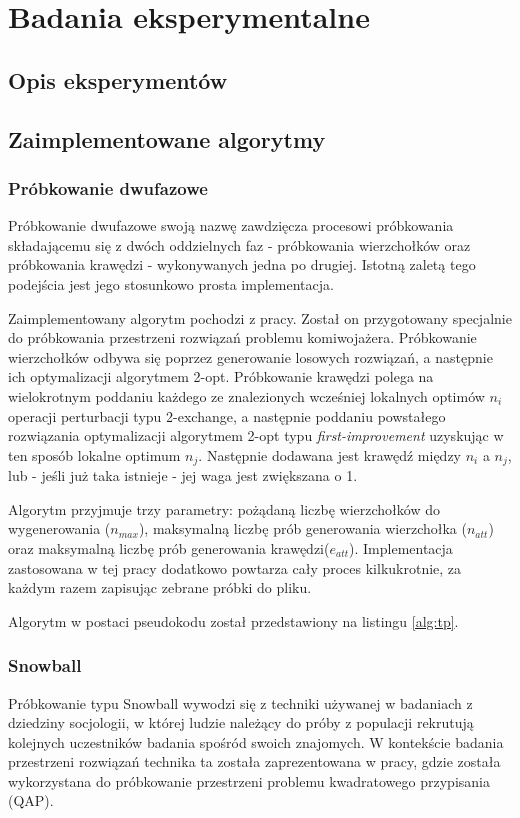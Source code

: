 \chapter{Badania eksperymentalne}

\section{Opis eksperymentów}
\section{Zaimplementowane algorytmy}
\subsection{Próbkowanie dwufazowe}
Próbkowanie dwufazowe swoją nazwę zawdzięcza procesowi próbkowania składającemu się z dwóch oddzielnych faz
- próbkowania wierzchołków oraz próbkowania krawędzi - wykonywanych jedna po drugiej.
Istotną zaletą tego podejścia jest jego stosunkowo prosta implementacja.

Zaimplementowany algorytm pochodzi z pracy\cite{DBLP:conf/depcos/BozejkoGNAB18}.
Został on przygotowany specjalnie do próbkowania przestrzeni rozwiązań problemu komiwojażera.
Próbkowanie wierzchołków odbywa się poprzez generowanie losowych rozwiązań, a następnie ich optymalizacji algorytmem 2-opt.
Próbkowanie krawędzi polega na wielokrotnym poddaniu każdego ze znalezionych wcześniej lokalnych optimów $n_i$ operacji perturbacji typu 2-exchange,
a następnie poddaniu powstałego rozwiązania optymalizacji algorytmem 2-opt typu \textit{first-improvement} uzyskując w ten sposób lokalne optimum $n_j$.
Następnie dodawana jest krawędź między $n_i$ a $n_j$, lub - jeśli już taka istnieje - jej waga jest zwiększana o 1.

Algorytm przyjmuje trzy parametry: pożądaną liczbę wierzchołków do wygenerowania ($n_{max}$), maksymalną liczbę prób generowania wierzchołka ($n_{att}$)
oraz maksymalną liczbę prób generowania krawędzi($e_{att}$).
Implementacja zastosowana w tej pracy dodatkowo powtarza cały proces kilkukrotnie, za każdym razem zapisując zebrane próbki do pliku.

Algorytm w postaci pseudokodu został przedstawiony na listingu \ref{alg:tp}.

\subsection{Snowball}
Próbkowanie typu Snowball wywodzi się z techniki używanej w badaniach z dziedziny socjologii, w której ludzie należący do próby z populacji
rekrutują kolejnych uczestników badania spośród swoich znajomych.
W kontekście badania przestrzeni rozwiązań technika ta została zaprezentowana w pracy\cite{DBLP:conf/ppsn/VerelDOT18}, gdzie została wykorzystana
do próbkowanie przestrzeni problemu kwadratowego przypisania (QAP).

